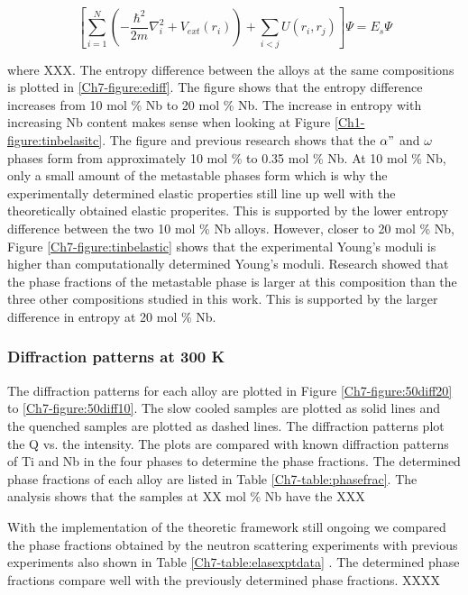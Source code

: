 \begin{equation}
\label{eq:phononentropy}
\left[ \sum_{i=1}^{N} \left( - \frac{\hbar^2}{2m} \nabla_{i}^2 + V_{ext} (r_{i}) \right) + \sum_{i<j} U (r_{i}, r_{j}) \right] \Psi = E_{s} \Psi
\end{equation}

\noindent where XXX. The entropy difference between the alloys at the same compositions is plotted in \ref{Ch7-figure:ediff}. The figure shows that the entropy difference increases from 10 mol \% Nb to 20 mol \% Nb. The increase in entropy with increasing Nb content makes sense when looking at Figure \ref{Ch1-figure:tinbelasitc}. The figure and previous research shows that the $\alpha"$ and $\omega$ phases form from approximately 10 mol \% to 0.35 mol \% Nb. At 10 mol \% Nb, only a small amount of the metastable phases form which is why the experimentally determined elastic properties still line up well with the theoretically obtained elastic properites. This is supported by the lower entropy difference between the two 10 mol \% Nb alloys. However, closer to 20 mol \% Nb, Figure \ref{Ch7-figure:tinbelastic} shows that the experimental Young's moduli is higher than computationally determined Young's moduli. Research showed that the phase fractions of the metastable phase is larger at this composition than the three other compositions studied in this work. This is supported by the larger difference in entropy at 20 mol \% Nb.

\subsubsection{Diffraction patterns at 300 K}

The diffraction patterns for each alloy are plotted in Figure \ref{Ch7-figure:50diff20} to \ref{Ch7-figure:50diff10}. The slow cooled samples are plotted as solid lines and the quenched samples are plotted as dashed lines. The diffraction patterns plot the Q vs. the intensity. The plots are compared with known diffraction patterns of Ti and Nb in the four phases to determine the phase fractions. The determined phase fractions of each alloy are listed in Table \ref{Ch7-table:phasefrac}. The analysis shows that the samples at XX mol \% Nb have the XXX 

With the implementation of the theoretic framework still ongoing we compared the phase fractions obtained by the neutron scattering experiments with previous experiments also shown in Table \ref{Ch7-table:elasexptdata} \cite{Ozaki2004,Timoshevskii2011,Friak2012,Karre2015}. The determined phase fractions compare well with the previously determined phase fractions. XXXX

